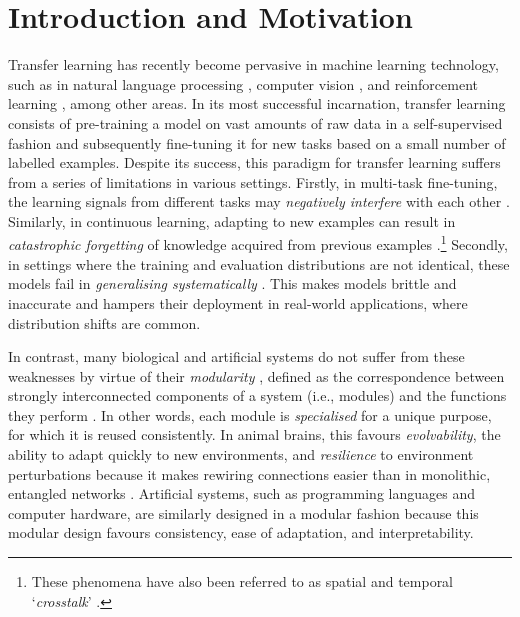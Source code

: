 \documentclass[10pt]{article} %
\begin{document}
\section{Introduction and Motivation}
\label{sec:intro}
Transfer learning has recently become pervasive in machine learning technology, such as in natural language processing \citep{ruder2019transfer,brown2020language}, computer vision \citep{dosovitskiy2020image}, and reinforcement learning \citep{reed2022generalist}, among other areas. In its most successful incarnation, transfer learning consists of pre-training a model on vast amounts of raw data in a self-supervised fashion and subsequently fine-tuning it for new tasks based on a small number of labelled examples. Despite its success, this paradigm for transfer learning suffers from a series of limitations in various settings. Firstly, in multi-task fine-tuning, the learning signals from different tasks may \textit{negatively interfere} with each other \citep{mccloskey1989catastrophicinterference}. Similarly, in continuous learning, adapting to new examples can result in \textit{catastrophic forgetting} of knowledge acquired from previous examples \citep{sutton1986two, french1999catastrophic}.\footnote{These phenomena have also been referred to as spatial and temporal `\textit{crosstalk}' \citep{jacobs1991adaptive}.}
Secondly, in settings where the training and evaluation distributions are not identical, these models fail in \textit{generalising systematically} \citep{lake2018generalization,hupkes2020compositionality}. This makes models brittle and inaccurate and hampers their deployment in real-world applications, where distribution shifts are common.

In contrast, many biological and artificial systems do not suffer from these weaknesses by virtue of their \textit{modularity} \citep{fodor1983modularity,ballard1986cortical}, defined as the correspondence between strongly interconnected components of a system (i.e., modules) and the functions they perform \citep{baldwin2000design,ulrich1995role}. In other words, each module is \textit{specialised} for a unique purpose, for which it is reused consistently. In animal brains, this favours \textit{evolvability}, the ability to adapt quickly to new environments, and \textit{resilience} to environment perturbations \citep{wagner2005natural} because it makes rewiring connections easier than in monolithic, entangled networks \citep{kashtan2005spontaneous}. Artificial systems, such as programming languages and computer hardware, are similarly designed in a modular fashion \citep{booch2008object,baldwin2000design} because this modular design favours consistency, ease of adaptation, and interpretability.
\end{document}
